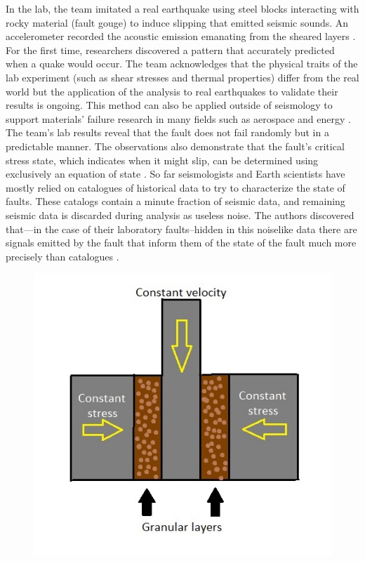 \documentclass[]{llncs} %
\begin{document}
In the lab, the team imitated a real earthquake using steel blocks interacting with rocky material (fault gouge) to induce slipping that emitted seismic sounds. An accelerometer recorded the acoustic emission emanating from the sheared layers \cite{LANLNews}. For the first time, researchers discovered a pattern that accurately predicted when a quake would occur. The team acknowledges that the physical traits of the lab experiment (such as shear stresses and thermal properties) differ from the real world but the application of the analysis to real earthquakes to validate their results is ongoing. This method can also be applied outside of seismology to support materials’ failure research in many fields such as aerospace and energy \cite{LANLNews}. The team’s lab results reveal that the fault does not fail randomly but in a predictable manner. The observations also demonstrate that the fault’s critical stress state, which indicates when it might slip, can be determined using exclusively an equation of state \cite{LANLNews}. So far seismologists and Earth scientists have mostly relied on catalogues of historical data to try to characterize the state of faults. These catalogs contain a minute fraction of seismic data, and remaining seismic data is discarded during analysis as useless noise. The authors discovered that—in the case of their laboratory faults--hidden in this noiselike data there are signals emitted by the fault that inform them of the state of the fault much more precisely than catalogues \cite{LANLNews}. \par

\begin{figure}[h!]
	\centering
	\includegraphics[width=01\linewidth]{lab}
	\caption{}
	\label{fig:lab}
\end{figure}
\end{document}
